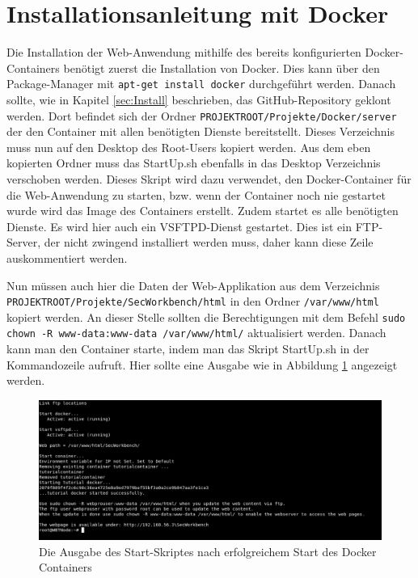 \section{Installationsanleitung mit Docker}
\label{sec:InstallWithDocker}

Die Installation der Web-Anwendung mithilfe des bereits konfigurierten Docker-Containers benötigt zuerst die Installation von Docker. Dies kann über den Package-Manager mit \colorbox{altgray}{\lstinline|apt-get install docker|} durchgeführt werden. Danach sollte, wie in Kapitel \ref{sec:Install} beschrieben, das GitHub-Repository geklont werden. Dort befindet sich der Ordner \colorbox{altgray}{\lstinline|PROJEKTROOT/Projekte/Docker/server |} der den Container mit allen benötigten Dienste bereitstellt. Dieses Verzeichnis muss nun auf den Desktop des Root-Users kopiert werden. Aus dem eben kopierten Ordner muss das StartUp.sh ebenfalls in das Desktop Verzeichnis verschoben werden. Dieses Skript wird dazu verwendet, den Docker-Container für die Web-Anwendung zu starten, bzw. wenn der Container noch nie gestartet wurde wird das Image des Containers erstellt. Zudem startet es alle benötigten Dienste. Es wird hier auch ein VSFTPD-Dienst gestartet. Dies ist ein FTP-Server, der nicht zwingend installiert werden muss, daher kann diese Zeile auskommentiert werden.\medskip

Nun müssen auch hier die Daten der Web-Applikation aus dem Verzeichnis \colorbox{altgray}{\lstinline|PROJEKTROOT/Projekte/SecWorkbench/html|} in den Ordner \colorbox{altgray}{\lstinline|/var/www/html|} kopiert werden. An dieser Stelle sollten die Berechtigungen mit dem Befehl \colorbox{altgray}{\lstinline|sudo chown -R www-data:www-data /var/www/html/|} aktualisiert werden. Danach kann man den Container starte, indem man das Skript StartUp.sh in der Kommandozeile aufruft. Hier sollte eine Ausgabe wie in Abbildung \ref{fig:startUp} angezeigt werden.

\begin{figure}[H]
	\centering
	\includegraphics[width=\textwidth]{images/Installation/startUp.png}
	\caption{Die Ausgabe des Start-Skriptes nach erfolgreichem Start des Docker Containers}
	\label{fig:startUp}
\end{figure}

